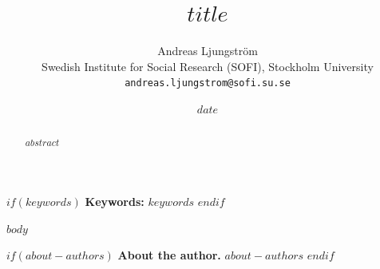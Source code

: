 \documentclass[12pt,a4paper]{article}
\title{$title$}
\author{%
  Andreas Ljungström\\
  \small Swedish Institute for Social Research (SOFI), Stockholm University\\
  \small\texttt{andreas.ljungstrom@sofi.su.se}%
}
\date{$date$}
\begin{document}
\maketitle

\begin{abstract}
\noindent $abstract$
\end{abstract}

$if(keywords)$
\medskip\noindent\textbf{Keywords:} $keywords$
$endif$

\bigskip

$body$




$if(about-authors)$
\bigskip\noindent\textbf{About the author.} $about-authors$
$endif$
\end{document}

